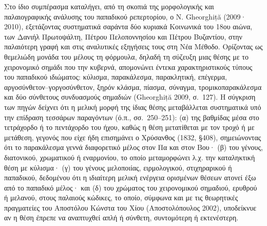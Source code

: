 \documentclass[11pt,a4paper]{article}
\begin{document}
Στο ίδιο συμπέρασμα καταλήγει, από τη σκοπιά της μορφολογικής και παλαιογραφικής ανάλυσης του παπαδικού ρεπερτορίου, ο N. Gheorghiță (2009· 2010), εξετάζοντας συστηματικά σαράντα δύο κυριακά Κοινωνικά του 18ου αιώνα, των Δανιήλ Πρωτοψάλτη, Πέτρου Πελοποννησίου και Πέτρου Βυζαντίου, στην παλαιότερη γραφή και στις αναλυτικές εξηγήσεις τους στη Νέα Μέθοδο. Ορίζοντας ως θεμελιώδη μονάδα του μέλους τη φόρμουλα, δηλαδή τη σύζευξη μιας θέσης με το χειρονομικό σημάδι που την κυβερνά, απομονώνει έντεκα χαρακτηριστικούς τύπους του παπαδικού ιδιώματος: κύλισμα, παρακάλεσμα, παρακλητική, επέγερμα, αργοσύνθετον--γοργοσύνθετον, ξηρόν κλάσμα, πίασμα, σύναγμα, τρομικοπαρακάλεσμα και δύο σύνθετους συνδυασμούς σημαδιών (Gheorghiță 2009, σ.~127). Η σύγκριση των πηγών δείχνει ότι η μελική μορφή της ίδιας θέσης μεταβάλλεται συστηματικά υπό την επίδραση τεσσάρων παραγόντων (ό.π., σσ.~250--251): (α) της βαθμίδας μέσα στο τετράχορδο ή το πεντάχορδο του ήχου, καθώς η θέση μετατίθεται με τον τροχό ή με μετάθεση, γεγονός που είχε ήδη επισημάνει ο Χρύσανθος (1832, §408), σημειώνοντας ότι το παρακάλεσμα γεννά διαφορετικό μέλος στον Πα και στον Βου· (β) του γένους, διατονικού, χρωματικού ή εναρμονίου, το οποίο μεταμορφώνει λ.χ. την καταληκτική θέση με κύλισμα· (γ) του γένους μελοποιίας, ειρμολογικού, στιχηραρικού ή παπαδικού, δεδομένου ότι η ιδιαίτερη μελική ενέργεια ορισμένων θέσεων ατονεί έξω από το παπαδικό μέλος· και (δ) του χρώματος του χειρονομικού σημαδιού, ερυθρού ή μελανού, στους παλαιούς κώδικες, το οποίο, σύμφωνα και με τις θεωρητικές πραγματείες του Αποστόλου Κώνστα του Χίου (Αποστολόπουλος 2002), υποδείκνυε αν η θέση έπρεπε να αναπτυχθεί απλή ή σύνθετη, συντομότερη ή εκτενέστερη.
\end{document}
